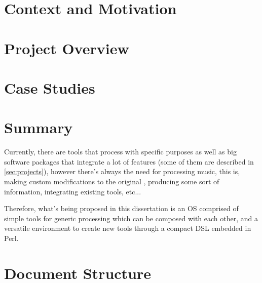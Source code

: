 \section{Context and Motivation}


\section{Project Overview}


\section{Case Studies}
\label{sec:case_studies}


\section{Summary}

Currently, there are tools that process \abc{} with specific purposes as well as big software
packages that integrate a lot of features (some of them are described in \ref{sec:projects}),
however there's always the need for processing music, this is, making custom modifications to the
original \abc{}, producing some sort of information, integrating existing tools, etc...

Therefore, what's being proposed in this dissertation is an \ac{OS} comprised of simple tools for
generic \abc{} processing which can be composed with each other, and a versatile environment to
create new tools through a compact \ac{DSL} embedded in Perl.

\section{Document Structure}
\label{sec:document_structure}

